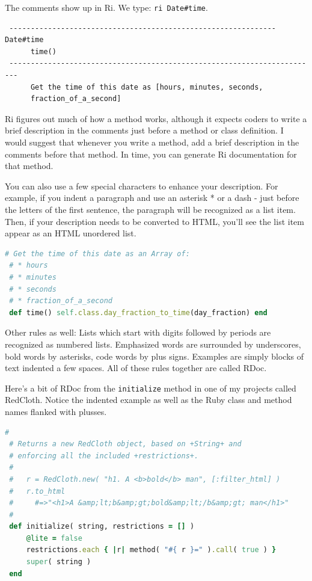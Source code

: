 \documentclass[10pt,twoside]{report}
\begin{document}
The comments show up in Ri. We type: \lstinline[breaklines=false]|ri Date#time|.

\begin{lstlisting}
 -------------------------------------------------------------- Date#time
      time()
 ------------------------------------------------------------------------
      Get the time of this date as [hours, minutes, seconds,
      fraction_of_a_second]
\end{lstlisting}

Ri figures out much of how a method works, although it expects coders
to write a brief description in the comments just before a method or
class definition. I would suggest that whenever you write a method,
add a brief description in the comments before that method. In time,
you can generate Ri documentation for that method.

You can also use a few special characters to enhance your
description. For example, if you indent a paragraph and use an
asterisk * or a dash - just before the letters of the first sentence,
the paragraph will be recognized as a list item. Then, if your
description needs to be converted to HTML, you'll see the list item
appear as an HTML unordered list.

\begin{lstlisting}[basicstyle=\ttfamily\color{basiccolor},
    commentstyle = \ttfamily\color{commentcolor},
    keywordstyle=\ttfamily\color{keywordscolor},
    stringstyle=\color{stringcolor},
    language=Ruby,
    basicstyle=\small\ttfamily,
    showstringspaces=false,
  ]
 # Get the time of this date as an Array of:
 # * hours
 # * minutes
 # * seconds
 # * fraction_of_a_second
 def time() self.class.day_fraction_to_time(day_fraction) end
\end{lstlisting}

Other rules as well: Lists which start with digits followed by periods
are recognized as numbered lists. Emphasized words are surrounded by
underscores, bold words by asterisks, code words by plus
signs. Examples are simply blocks of text indented a few spaces. All
of these rules together are called RDoc.

Here's a bit of RDoc from the \lstinline[breaklines=false]|initialize|
method in one of my projects called RedCloth. Notice the indented
example as well as the Ruby class and method names flanked with
plusses.

\begin{lstlisting}[basicstyle=\ttfamily\color{basiccolor},
    commentstyle = \ttfamily\color{commentcolor},
    keywordstyle=\ttfamily\color{keywordscolor},
    stringstyle=\color{stringcolor},
    language=Ruby,
    basicstyle=\small\ttfamily,
    showstringspaces=false,
  ]
 #
 # Returns a new RedCloth object, based on +String+ and
 # enforcing all the included +restrictions+.
 #
 #   r = RedCloth.new( "h1. A <b>bold</b> man", [:filter_html] )
 #   r.to_html
 #     #=>"<h1>A &amp;lt;b&amp;gt;bold&amp;lt;/b&amp;gt; man</h1>" 
 #
 def initialize( string, restrictions = [] )
     @lite = false
     restrictions.each { |r| method( "#{ r }=" ).call( true ) }
     super( string )
 end
\end{lstlisting}
\end{document}
